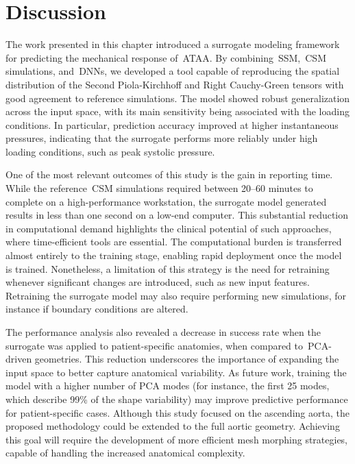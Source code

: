 \documentclass[a4paper,fleqn]{cas-sc}
\begin{document}
\section{Discussion} \label{sec:discussion}
The work presented in this chapter introduced a surrogate modeling framework for predicting the mechanical response of~\gls{ATAA}. By combining~\gls{SSM},~\gls{CSM} simulations, and~\glspl{DNN}, we developed a tool capable of reproducing the spatial distribution of the Second Piola-Kirchhoff and Right Cauchy-Green tensors with good agreement to reference simulations. The model showed robust generalization across the input space, with its main sensitivity being associated with the loading conditions. In particular, prediction accuracy improved at higher instantaneous pressures, indicating that the surrogate performs more reliably under high loading conditions, such as peak systolic pressure.

One of the most relevant outcomes of this study is the gain in reporting time. While the reference~\gls{CSM} simulations required between 20--60 minutes to complete on a high-performance workstation, the surrogate model generated results in less than one second on a low-end computer. This substantial reduction in computational demand highlights the clinical potential of such approaches, where time-efficient tools are essential. The computational burden is transferred almost entirely to the training stage, enabling rapid deployment once the model is trained. Nonetheless, a limitation of this strategy is the need for retraining whenever significant changes are introduced, such as new input features. Retraining the surrogate model may also require performing new simulations, for instance if boundary conditions are altered.

The performance analysis also revealed a decrease in success rate when the surrogate was applied to patient-specific anatomies, when compared to~\gls{PCA}-driven geometries. This reduction underscores the importance of expanding the input space to better capture anatomical variability. As future work, training the model with a higher number of PCA modes (for instance, the first 25 modes, which describe 99\% of the shape variability) may improve predictive performance for patient-specific cases. Although this study focused on the ascending aorta, the proposed methodology could be extended to the full aortic geometry. Achieving this goal will require the development of more efficient mesh morphing strategies, capable of handling the increased anatomical complexity.
\end{document}
